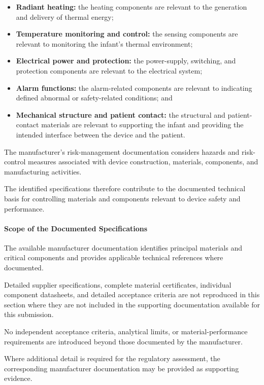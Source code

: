\begin{itemize}
    \item \textbf{Radiant heating:} the heating components are
    relevant to the generation and delivery of thermal energy;
    \item \textbf{Temperature monitoring and control:} the sensing
    components are relevant to monitoring the infant's thermal
    environment;
    \item \textbf{Electrical power and protection:} the power-supply,
    switching, and protection components are relevant to the
    electrical system;
    \item \textbf{Alarm functions:} the alarm-related components are
    relevant to indicating defined abnormal or safety-related
    conditions; and
    \item \textbf{Mechanical structure and patient contact:} the
    structural and patient-contact materials are relevant to
    supporting the infant and providing the intended interface
    between the device and the patient.
\end{itemize}

The manufacturer's risk-management documentation considers hazards
and risk-control measures associated with device construction,
materials, components, and manufacturing activities.

The identified specifications therefore contribute to the documented
technical basis for controlling materials and components relevant
to device safety and performance.

\paragraph{Scope of the Documented Specifications}

The available manufacturer documentation identifies principal
materials and critical components and provides applicable technical
references where documented.

Detailed supplier specifications, complete material certificates,
individual component datasheets, and detailed acceptance criteria
are not reproduced in this section where they are not included in
the supporting documentation available for this submission.

No independent acceptance criteria, analytical limits, or
material-performance requirements are introduced beyond those
documented by the manufacturer.

Where additional detail is required for the regulatory assessment,
the corresponding manufacturer documentation may be provided as
supporting evidence.

